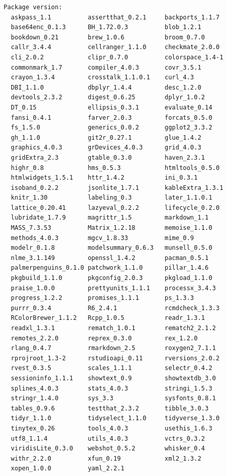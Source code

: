 \documentclass[
  11pt,
]{scrartcl}
\begin{document}
\begin{verbatim}
Package version:
  askpass_1.1          assertthat_0.2.1     backports_1.1.7     
  base64enc_0.1.3      BH_1.72.0.3          blob_1.2.1          
  bookdown_0.21        brew_1.0.6           broom_0.7.0         
  callr_3.4.4          cellranger_1.1.0     checkmate_2.0.0     
  cli_2.0.2            clipr_0.7.0          colorspace_1.4-1    
  commonmark_1.7       compiler_4.0.3       covr_3.5.1          
  crayon_1.3.4         crosstalk_1.1.0.1    curl_4.3            
  DBI_1.1.0            dbplyr_1.4.4         desc_1.2.0          
  devtools_2.3.2       digest_0.6.25        dplyr_1.0.2         
  DT_0.15              ellipsis_0.3.1       evaluate_0.14       
  fansi_0.4.1          farver_2.0.3         forcats_0.5.0       
  fs_1.5.0             generics_0.0.2       ggplot2_3.3.2       
  gh_1.1.0             git2r_0.27.1         glue_1.4.2          
  graphics_4.0.3       grDevices_4.0.3      grid_4.0.3          
  gridExtra_2.3        gtable_0.3.0         haven_2.3.1         
  highr_0.8            hms_0.5.3            htmltools_0.5.0     
  htmlwidgets_1.5.1    httr_1.4.2           ini_0.3.1           
  isoband_0.2.2        jsonlite_1.7.1       kableExtra_1.3.1    
  knitr_1.30           labeling_0.3         later_1.1.0.1       
  lattice_0.20.41      lazyeval_0.2.2       lifecycle_0.2.0     
  lubridate_1.7.9      magrittr_1.5         markdown_1.1        
  MASS_7.3.53          Matrix_1.2.18        memoise_1.1.0       
  methods_4.0.3        mgcv_1.8.33          mime_0.9            
  modelr_0.1.8         modelsummary_0.6.3   munsell_0.5.0       
  nlme_3.1.149         openssl_1.4.2        pacman_0.5.1        
  palmerpenguins_0.1.0 patchwork_1.1.0      pillar_1.4.6        
  pkgbuild_1.1.0       pkgconfig_2.0.3      pkgload_1.1.0       
  praise_1.0.0         prettyunits_1.1.1    processx_3.4.3      
  progress_1.2.2       promises_1.1.1       ps_1.3.3            
  purrr_0.3.4          R6_2.4.1             rcmdcheck_1.3.3     
  RColorBrewer_1.1.2   Rcpp_1.0.5           readr_1.3.1         
  readxl_1.3.1         rematch_1.0.1        rematch2_2.1.2      
  remotes_2.2.0        reprex_0.3.0         rex_1.2.0           
  rlang_0.4.7          rmarkdown_2.5        roxygen2_7.1.1      
  rprojroot_1.3-2      rstudioapi_0.11      rversions_2.0.2     
  rvest_0.3.5          scales_1.1.1         selectr_0.4.2       
  sessioninfo_1.1.1    showtext_0.9         showtextdb_3.0      
  splines_4.0.3        stats_4.0.3          stringi_1.5.3       
  stringr_1.4.0        sys_3.3              sysfonts_0.8.1      
  tables_0.9.6         testthat_2.3.2       tibble_3.0.3        
  tidyr_1.1.0          tidyselect_1.1.0     tidyverse_1.3.0     
  tinytex_0.26         tools_4.0.3          usethis_1.6.3       
  utf8_1.1.4           utils_4.0.3          vctrs_0.3.2         
  viridisLite_0.3.0    webshot_0.5.2        whisker_0.4         
  withr_2.2.0          xfun_0.19            xml2_1.3.2          
  xopen_1.0.0          yaml_2.2.1          
\end{verbatim}
\end{document}

